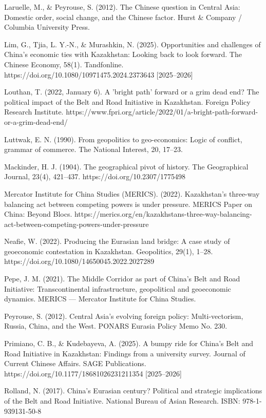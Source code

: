 \documentclass[12pt]{article}
\begin{document}
Laruelle, M., \& Peyrouse, S. (2012). The Chinese question in Central Asia: Domestic order, social change, and the Chinese factor. Hurst \& Company / Columbia University Press.\par
Lim, G., Tjia, L. Y.-N., \& Murashkin, N. (2025). Opportunities and challenges of China's economic ties with Kazakhstan: Looking back to look forward. The Chinese Economy, 58(1). Tandfonline. https://doi.org/10.1080/10971475.2024.2373643 [2025--2026]\par
Louthan, T. (2022, January 6). A 'bright path' forward or a grim dead end? The political impact of the Belt and Road Initiative in Kazakhstan. Foreign Policy Research Institute. https://www.fpri.org/article/2022/01/a-bright-path-forward-or-a-grim-dead-end/\par
Luttwak, E. N. (1990). From geopolitics to geo-economics: Logic of conflict, grammar of commerce. The National Interest, 20, 17--23.\par
Mackinder, H. J. (1904). The geographical pivot of history. The Geographical Journal, 23(4), 421--437. https://doi.org/10.2307/1775498\par
Mercator Institute for China Studies (MERICS). (2022). Kazakhstan's three-way balancing act between competing powers is under pressure. MERICS Paper on China: Beyond Blocs. https://merics.org/en/kazakhstans-three-way-balancing-act-between-competing-powers-under-pressure\par
Neafie, W. (2022). Producing the Eurasian land bridge: A case study of geoeconomic contestation in Kazakhstan. Geopolitics, 29(1), 1--28. https://doi.org/10.1080/14650045.2022.2027289\par
Pepe, J. M. (2021). The Middle Corridor as part of China's Belt and Road Initiative: Transcontinental infrastructure, geopolitical and geoeconomic dynamics. MERICS --- Mercator Institute for China Studies.\par
Peyrouse, S. (2012). Central Asia's evolving foreign policy: Multi-vectorism, Russia, China, and the West. PONARS Eurasia Policy Memo No. 230.\par
Primiano, C. B., \& Kudebayeva, A. (2025). A bumpy ride for China's Belt and Road Initiative in Kazakhstan: Findings from a university survey. Journal of Current Chinese Affairs. SAGE Publications. https://doi.org/10.1177/18681026231211354 [2025--2026]\par
Rolland, N. (2017). China's Eurasian century? Political and strategic implications of the Belt and Road Initiative. National Bureau of Asian Research. ISBN: 978-1-939131-50-8\par
\end{document}
